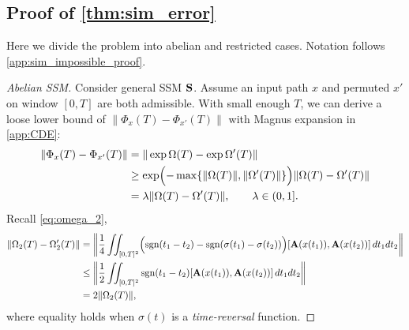 \subsection{Proof of \cref{thm:sim_error}}
\label{app:sim_error_proof}
Here we divide the problem into abelian and restricted cases.
Notation follows \cref{app:sim_impossible_proof}.
\begin{proof}[Abelian SSM]
    Consider general SSM $\mathbf{S}$.
    Assume an input path $x$ and permuted $x'$ on window $[0,T]$ are both admissible.
    With small enough $T$, we can derive a loose lower bound of $\|\Phi_{x}(T) - \Phi_{x'}(T)\|$ with Magnus expansion in \cref{app:CDE}:
    \begin{align*}
        \|\Phi_x(T) - \Phi_{x'}(T)\|
        &= \|\exp \Omega(T) - \exp \Omega'(T) \| \\
        & \ge \exp \Bigl(
        - \max
        \{ \|\Omega(T)\|, \| \Omega'(T) \| \}
        \Bigr)
        \| \Omega(T) - \Omega'(T) \| \\
        &= \lambda\| \Omega(T) - \Omega'(T) \|, \qquad \lambda \in (0,1].
    \end{align*}
    Recall \cref{eq:omega_2},
    \begin{align*}
        \|\Omega_2(T) - \Omega_2'(T)\|
        &= 
        \biggl\|
        \frac{1}{4}\iint_{[0,T]^2}
        \Bigl(
        \text{sgn}(t_1 - t_2)
        -
        \text{sgn}(\sigma(t_1) - \sigma(t_2))
        \Bigr)
        [\mathbf{A}(x(t_1)), \mathbf{A}(x(t_2))]
        \, dt_1 dt_2
        \biggr\| \\
        &\le 
        \biggl \|
        \frac{1}{2} \iint_{[0,T]^2}
        \text{sgn}(t_1 - t_2)
        [\mathbf{A}(x(t_1)), \mathbf{A}(x(t_2))]
        \, dt_1 dt_2
        \biggr \| \\
        &= 2\|\Omega_2(T)\|,
    \end{align*}
    where equality holds when $\sigma(t)$ is a \emph{time-reversal} function.


\end{proof}
